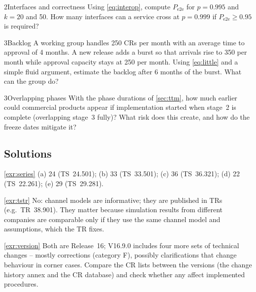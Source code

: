 \documentclass[11pt,a4paper]{article}
\begin{document}
\begin{exercisebox}{2}{Interfaces and correctness}\label{exr:interop}
Using \cref{eq:interop}, compute $P_{\mathrm{e2e}}$ for $p = 0.995$ and $k = 20$ and 50. How many interfaces can a service
cross at $p = 0.999$ if $P_{\mathrm{e2e}} \ge 0.95$ is required?
\end{exercisebox}

\begin{exercisebox}{3}{Backlog}\label{exr:backlog}
A working group handles 250 CRs per month with an average time to approval of 4 months. A new release adds a burst so that
arrivals rise to 350 per month while approval capacity stays at 250 per month. Using \cref{eq:little} and a simple fluid
argument, estimate the backlog after 6 months of the burst. What can the group do?
\end{exercisebox}

\begin{exercisebox}{3}{Overlapping phases}\label{exr:ttm}
With the phase durations of \cref{sec:ttm}, how much earlier could commercial products appear if implementation started
when stage~2 is complete (overlapping stage~3 fully)? What risk does this create, and how do the freeze dates mitigate it?
\end{exercisebox}

\subsection*{Solutions}

\begin{solutionbox}{\ref{exr:series}}
(a) 24 (TS~24.501); (b) 33 (TS~33.501); (c) 36 (TS~36.321); (d) 22 (TS~22.261); (e) 29 (TS~29.281).
\end{solutionbox}

\begin{solutionbox}{\ref{exr:tstr}}
No: channel models are informative; they are published in TRs (e.g.\ TR~38.901). They matter because simulation results from
different companies are comparable only if they use the same channel model and assumptions, which the TR fixes.
\end{solutionbox}

\begin{solutionbox}{\ref{exr:version}}
Both are Release~16; V16.9.0 includes four more sets of technical changes -- mostly corrections (category F), possibly
clarifications that change behaviour in corner cases. Compare the CR lists between the versions (the change history
annex and the CR database) and check whether any affect implemented procedures.
\end{solutionbox}
\end{document}

